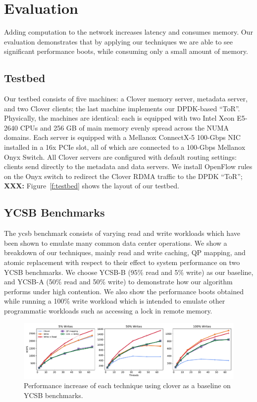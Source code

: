 \section{Evaluation}
\label{s:results}

Adding computation to the network increases latency and consumes memory. Our
evaluation demonstrates that by applying our techniques we are able to see
significant performance boots, while consuming only a small amount of memory.

\subsection{Testbed}


Our testbed consists of five machines: a Clover memory server,
metadata server, and two Clover clients; the last machine implements
our DPDK-based ``ToR''. Physically, the machines are identical: each
is equipped with two Intel Xeon E5-2640 CPUs and 256 GB of main memory
evenly spread across the NUMA domains. Each server is equipped with a
Mellanox ConnectX-5 100-Gbps NIC installed in a 16x PCIe slot, all of
which are connected to a 100-Gbps Mellanox Onyx Switch. All Clover
servers are configured with default routing settings: clients send
directly to the metadata and data servers. We install OpenFlow rules
on the Onyx switch to redirect the Clover RDMA traffic to the DPDK
``ToR''; \textbf{XXX:} Figure~\ref{f:testbed} shows the layout of our
testbed.

\subsection{YCSB Benchmarks}

The ycsb benchmark consists of varying read and write workloads which have been
shown to emulate many common data center operations. We show a breakdown of our
techniques, mainly read and write caching, QP mapping, and atomic replacement
with respect to their effect to system performance on two YCSB benchmarks. We
choose YCSB-B (95\% read and 5\% write) as our baseline, and YCSB-A (50\% read and
50\% write) to demonstrate how our algorithm performs under high contention. We
also show the performance boots obtained while running a 100\% write workload
which is intended to emulate other programmatic workloads such as accessing a
lock in remote memory.

\begin{figure}
    \includegraphics[width=1.0\textwidth]{fig/full_system_performance.pdf}
    \caption{{Performance increase of each technique using clover as a baseline on YCSB benchmarks.}}
    \label{fig:full_system_performance}
\end{figure}

